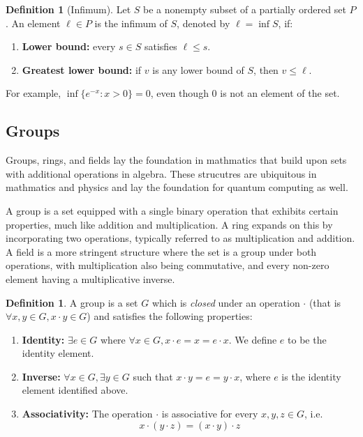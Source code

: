\documentclass[12pt]{article}
\theoremstyle{definition}
\newtheorem{definition}[theorem]{Definition}
\begin{document}
\begin{definition}[Infimum]
Let $S$ be a nonempty subset of a partially ordered set $P$. An element $\ell \in P$ is the infimum of $S$, denoted by $\ell=\inf S$, if:
\begin{enumerate}
\item \textbf{Lower bound:} every $s\in S$ satisfies $\ell \le s$.
\item \textbf{Greatest lower bound:} if $v$ is any lower bound of $S$, then $v \le \ell$.
\end{enumerate}
For example, $\inf\{e^{-x}: x>0\}=0$, even though $0$ is not an element of the set.
\end{definition}


\subsection{Groups}

Groups, rings, and fields lay the foundation in mathmatics that build upon sets with additional operations in algebra. These strucutres are ubiquitous in mathmatics and physics and lay the foundation for quantum computing as well. 

A group is a set equipped with a single binary operation that exhibits certain properties, much like addition and multiplication. A ring expands on this by incorporating two operations, typically referred to as multiplication and addition. A field is a more stringent structure where the set is a group under both operations, with multiplication also being commutative, and every non-zero element having a multiplicative inverse. 

\begin{definition}
    A group is a set $G$ which is \textit{closed} under an operation $\cdot$ (that is $\forall x, y \in G, x \cdot y \in G$) and satisfies the following properties:

    \begin{enumerate}
        \item \textbf{Identity:} $\exists e \in G$ where $\forall x \in G, x \cdot e = x = e \cdot x$. We define $e$ to be the identity element.
        \item \textbf{Inverse:} $\forall x \in G, \exists y \in G$ such that $x \cdot y = e = y \cdot x$, where $e$ is the identity element identified above. 
        \item \textbf{Associativity:} The operation $\cdot$ is associative for every $x, y, z \in G$, i.e. $$x\cdot(y\cdot z) = (x \cdot y)\cdot z$$
    \end{enumerate}
\end{definition}
\end{document}
